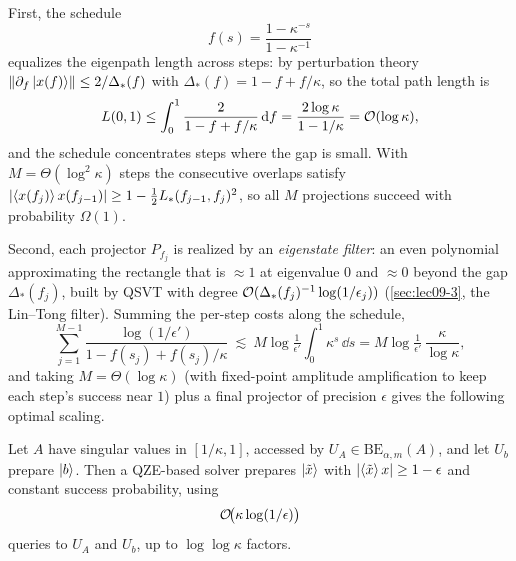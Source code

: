 First, the schedule
\begin{equation}
  f(s)=\frac{1-\kappa^{-s}}{1-\kappa^{-1}}
  \label{eq:lec10-zeno-schedule}
\end{equation}
equalizes the eigenpath length across steps: by perturbation theory
$\left\lVert \partial_f\ket{x(f)} \right\rVert\le2/\Delta_*(f)$ with $\Delta_*(f)=1-f+f/\kappa$, so the
total path length is
\begin{equation}
  L(0,1)\le\int_0^1\frac{2}{1-f+f/\kappa}\,\mathrm{d} f=\frac{2\log\kappa}{1-1/\kappa}
  =\mathcal{O}(\log\kappa),
  \label{eq:lec10-pathlen}
\end{equation}
and the schedule concentrates steps where the gap is small. With $M=\Theta(\log^2\kappa)$
steps the consecutive overlaps satisfy $\left\lvert \braket{x(f_j)}{x(f_{j-1})} \right\rvert\ge
1-\tfrac12 L_*(f_{j-1},f_j)^2$, so all $M$ projections succeed with probability
$\Omega(1)$.

Second, each projector $P_{f_j}$ is realized by an \emph{eigenstate filter}: an even
polynomial approximating the rectangle that is $\approx1$ at eigenvalue $0$ and
$\approx0$ beyond the gap $\Delta_*(f_j)$, built by QSVT with degree
$\mathcal{O}(\Delta_*(f_j)^{-1}\log(1/\epsilon_j))$ (\cref{sec:lec09-3}, the Lin--Tong
filter). Summing the per-step costs along the schedule,
\begin{equation}
  \sum_{j=1}^{M-1}\frac{\log(1/\epsilon')}{1-f(s_j)+f(s_j)/\kappa}
  \ \lesssim\ M\log\tfrac1{\epsilon'}\!\int_0^1\!\kappa^{s}\,\dd s
  = M\log\tfrac1{\epsilon'}\,\frac{\kappa}{\log\kappa},
  \label{eq:lec10-zeno-sum}
\end{equation}
and taking $M=\Theta(\log\kappa)$ (with fixed-point amplitude amplification to keep each
step's success near $1$) plus a final projector of precision $\epsilon$ gives the
following optimal scaling.

\begin{theorem}
\label{thm:lec10-zeno}
Let $A$ have singular values in $[1/\kappa,1]$, accessed by
$U_A\in\mathrm{BE}_{\alpha,m}(A)$, and let $U_b$ prepare $\ket b$. Then a QZE-based
solver prepares $\ket{\tilde x}$ with $\left\lvert \braket{\tilde x}{x} \right\rvert\ge1-\epsilon$ and
constant success probability, using
\begin{equation}
  \mathcal{O}\!\bigl(\kappa\log(1/\epsilon)\bigr)
  \label{eq:lec10-zeno-cost}
\end{equation}
queries to $U_A$ and $U_b$, up to $\log\log\kappa$ factors.
\end{theorem}

